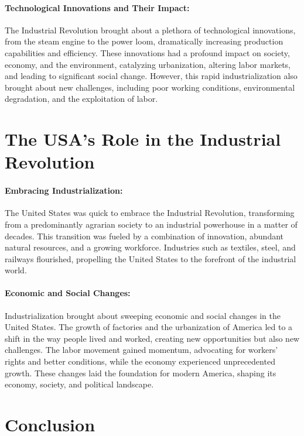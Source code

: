 \documentclass[a4paper,12pt]{book}
\begin{document}
\paragraph{Technological Innovations and Their Impact:}
The Industrial Revolution brought about a plethora of technological innovations, from the steam engine to the power loom, dramatically increasing production capabilities and efficiency. These innovations had a profound impact on society, economy, and the environment, catalyzing urbanization, altering labor markets, and leading to significant social change. However, this rapid industrialization also brought about new challenges, including poor working conditions, environmental degradation, and the exploitation of labor.

\section*{The USA’s Role in the Industrial Revolution}

\paragraph{Embracing Industrialization:}
The United States was quick to embrace the Industrial Revolution, transforming from a predominantly agrarian society to an industrial powerhouse in a matter of decades. This transition was fueled by a combination of innovation, abundant natural resources, and a growing workforce. Industries such as textiles, steel, and railways flourished, propelling the United States to the forefront of the industrial world.

\paragraph{Economic and Social Changes:}
Industrialization brought about sweeping economic and social changes in the United States. The growth of factories and the urbanization of America led to a shift in the way people lived and worked, creating new opportunities but also new challenges. The labor movement gained momentum, advocating for workers’ rights and better conditions, while the economy experienced unprecedented growth. These changes laid the foundation for modern America, shaping its economy, society, and political landscape.

\section*{Conclusion}
\end{document}
